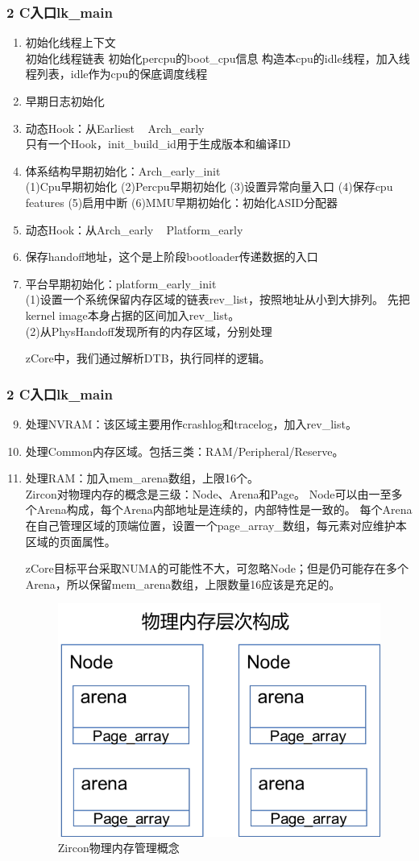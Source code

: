 \documentclass[
8pt, %
]{beamer}
\begin{document}
	\begin{frame}
		\frametitle{2 C入口lk\_main}
		\begin{enumerate}
			\item 初始化线程上下文\\
			初始化线程链表
			初始化percpu的boot\_cpu信息
			构造本cpu的idle线程，加入线程列表，idle作为cpu的保底调度线程
			\item 早期日志初始化
			\item 动态Hook：从Earliest ~ Arch\_early\\
			只有一个Hook，init\_build\_id用于生成版本和编译ID
			\item 体系结构早期初始化：Arch\_early\_init\\
			(1)Cpu早期初始化
			(2)Percpu早期初始化
			(3)设置异常向量入口
			(4)保存cpu features
			(5)启用中断
			(6)MMU早期初始化：初始化ASID分配器
			\item 动态Hook：从Arch\_early ~ Platform\_early
			\item 保存handoff地址，这个是上阶段bootloader传递数据的入口
			\item 平台早期初始化：platform\_early\_init\\
			(1)设置一个系统保留内存区域的链表rev\_list，按照地址从小到大排列。
			先把kernel image本身占据的区间加入rev\_list。\\
			(2)从PhysHandoff发现所有的内存区域，分别处理
			\begin{block}{}
				zCore中，我们通过解析DTB，执行同样的逻辑。
			\end{block}
		\end{enumerate}
	\end{frame}

	\begin{frame}
		\frametitle{2 C入口lk\_main}
		\begin{enumerate}\setcounter{enumi}{8}
			\item 处理NVRAM：该区域主要用作crashlog和tracelog，加入rev\_list。
			\item 处理Common内存区域。包括三类：RAM/Peripheral/Reserve。
			\item 处理RAM：加入mem\_arena数组，上限16个。\\
			Zircon对物理内存的概念是三级：Node、Arena和Page。
			Node可以由一至多个Arena构成，每个Arena内部地址是连续的，内部特性是一致的。
			每个Arena在自己管理区域的顶端位置，设置一个page\_array\_数组，每元素对应维护本区域的页面属性。
			\begin{block}{}
				zCore目标平台采取NUMA的可能性不大，可忽略Node；但是仍可能存在多个Arena，所以保留mem\_arena数组，上限数量16应该是充足的。
			\end{block}
			\begin{figure}
				\includegraphics[width=0.3\linewidth]{zircon_pmm.png}
				\caption{Zircon物理内存管理概念}
			\end{figure}
		\end{enumerate}
	\end{frame}
\end{document}

